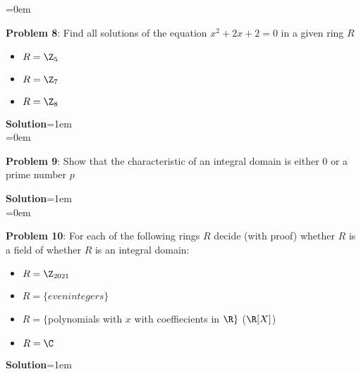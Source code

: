 \documentclass{article}
\begin{document}
\newpage\parskip=0em
\begin{mdframed}[backgroundcolor=blue!20]
\textbf{Problem 8}: Find all solutions of the equation $x^2 + 2x + 2 = 0$ in a given ring $R$
\begin{itemize}
    \item $R = \Z_5$
    \item $R = \Z_7$
    \item $R = \Z_8$
\end{itemize}
\end{mdframed}
\textbf{Solution}\parskip=1em\\

\newpage\parskip=0em
\begin{mdframed}[backgroundcolor=blue!20]
\textbf{Problem 9}: Show that the characteristic of an integral domain is either 0 or a prime number $p$
\end{mdframed}
\textbf{Solution}\parskip=1em\\

\newpage\parskip=0em
\begin{mdframed}[backgroundcolor=blue!20]
\textbf{Problem 10}: For each of the following rings $R$ decide (with proof) whether $R$ is a field of whether $R$ is an integral domain:
\begin{itemize}
    \item $R = \Z_{2021}$
    \item $R = \{even integers\}$
    \item $R = \{$polynomials with $x$ with coeffiecients in $\R\}$ ($\R[X]$)
    \item $R = \C$
\end{itemize}
\end{mdframed}
\textbf{Solution}\parskip=1em\\
\end{document}
